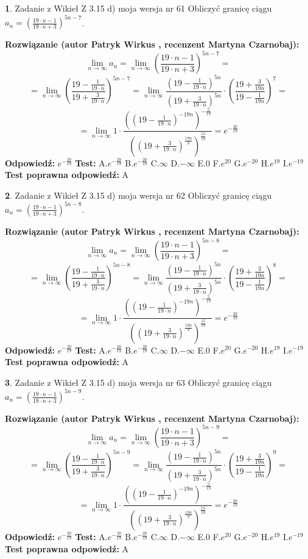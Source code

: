 \documentclass[12pt, a4paper]{article}
\theoremstyle{definition} %
\newtheorem{zad}{}
\newcommand{\zadStart}[1]{\begin{zad}#1\newline}
\newcommand{\zadStop}{\end{zad}}
\newcommand{\rozwStart}[2]{\noindent \textbf{Rozwiązanie (autor #1 , recenzent #2): }\newline}
\newcommand{\rozwStop}{\newline}
\newcommand{\odpStart}{\noindent \textbf{Odpowiedź:}\newline}
\newcommand{\odpStop}{\newline}
\newcommand{\testStart}{\noindent \textbf{Test:}\newline}
\newcommand{\testStop}{\newline}
\newcommand{\kluczStart}{\noindent \textbf{Test poprawna odpowiedź:}\newline}
\newcommand{\kluczStop}{\newline}
\begin{document}
\zadStart{Zadanie z Wikieł Z 3.15 d) moja wersja nr 61}
Obliczyć granicę ciągu $a_{n}=(\frac{19\cdot n - 1}{19 \cdot n + 3})^{5n-7}$.
\zadStop
\rozwStart{Patryk Wirkus}{Martyna Czarnobaj}
$$\lim\limits_{n\to\infty} a_{n} = \lim\limits_{n\to\infty}(\frac{19\cdot n - 1}{19 \cdot n + 3})^{5n-7}=$$
$$=\lim\limits_{n\to\infty}(\frac{19 - \frac{1}{19\cdot n}}{19 + \frac{3}{19 \cdot n}})^{5n-7}=\lim\limits_{n\to\infty}\frac{(19 - \frac{1}{19\cdot n})^{5n}}{(19 + \frac{3}{19\cdot n})^{5n}} \cdot (\frac{19+\frac{3}{19n}}{19-\frac{1}{19n}})^{7}=$$
$$=\lim\limits_{n\to\infty} 1 \cdot \frac{((19-\frac{1}{19 \cdot n})^{-19n})^{-\frac{5}{19}}}{((19+\frac{3}{19 \cdot n})^{\frac{19n}{3}})^{\frac{15}{19}}} =e^{-\frac{20}{19}}$$
\rozwStop
\odpStart
$e^{-\frac{20}{19}}$
\odpStop
\testStart
A.$ e^{-\frac{20}{19}}$
B.$ e^{-\frac{20}{19}}$
C.$\infty$
D.$-\infty$
E.$0$
F.$e^{20}$
G.$e^{-20}$
H.$e^{19}$
I.$e^{-19}$
\testStop
\kluczStart
A
\kluczStop



\zadStart{Zadanie z Wikieł Z 3.15 d) moja wersja nr 62}
Obliczyć granicę ciągu $a_{n}=(\frac{19\cdot n - 1}{19 \cdot n + 3})^{5n-8}$.
\zadStop
\rozwStart{Patryk Wirkus}{Martyna Czarnobaj}
$$\lim\limits_{n\to\infty} a_{n} = \lim\limits_{n\to\infty}(\frac{19\cdot n - 1}{19 \cdot n + 3})^{5n-8}=$$
$$=\lim\limits_{n\to\infty}(\frac{19 - \frac{1}{19\cdot n}}{19 + \frac{3}{19 \cdot n}})^{5n-8}=\lim\limits_{n\to\infty}\frac{(19 - \frac{1}{19\cdot n})^{5n}}{(19 + \frac{3}{19\cdot n})^{5n}} \cdot (\frac{19+\frac{3}{19n}}{19-\frac{1}{19n}})^{8}=$$
$$=\lim\limits_{n\to\infty} 1 \cdot \frac{((19-\frac{1}{19 \cdot n})^{-19n})^{-\frac{5}{19}}}{((19+\frac{3}{19 \cdot n})^{\frac{19n}{3}})^{\frac{15}{19}}} =e^{-\frac{20}{19}}$$
\rozwStop
\odpStart
$e^{-\frac{20}{19}}$
\odpStop
\testStart
A.$ e^{-\frac{20}{19}}$
B.$ e^{-\frac{20}{19}}$
C.$\infty$
D.$-\infty$
E.$0$
F.$e^{20}$
G.$e^{-20}$
H.$e^{19}$
I.$e^{-19}$
\testStop
\kluczStart
A
\kluczStop



\zadStart{Zadanie z Wikieł Z 3.15 d) moja wersja nr 63}
Obliczyć granicę ciągu $a_{n}=(\frac{19\cdot n - 1}{19 \cdot n + 3})^{5n-9}$.
\zadStop
\rozwStart{Patryk Wirkus}{Martyna Czarnobaj}
$$\lim\limits_{n\to\infty} a_{n} = \lim\limits_{n\to\infty}(\frac{19\cdot n - 1}{19 \cdot n + 3})^{5n-9}=$$
$$=\lim\limits_{n\to\infty}(\frac{19 - \frac{1}{19\cdot n}}{19 + \frac{3}{19 \cdot n}})^{5n-9}=\lim\limits_{n\to\infty}\frac{(19 - \frac{1}{19\cdot n})^{5n}}{(19 + \frac{3}{19\cdot n})^{5n}} \cdot (\frac{19+\frac{3}{19n}}{19-\frac{1}{19n}})^{9}=$$
$$=\lim\limits_{n\to\infty} 1 \cdot \frac{((19-\frac{1}{19 \cdot n})^{-19n})^{-\frac{5}{19}}}{((19+\frac{3}{19 \cdot n})^{\frac{19n}{3}})^{\frac{15}{19}}} =e^{-\frac{20}{19}}$$
\rozwStop
\odpStart
$e^{-\frac{20}{19}}$
\odpStop
\testStart
A.$ e^{-\frac{20}{19}}$
B.$ e^{-\frac{20}{19}}$
C.$\infty$
D.$-\infty$
E.$0$
F.$e^{20}$
G.$e^{-20}$
H.$e^{19}$
I.$e^{-19}$
\testStop
\kluczStart
A
\kluczStop
\end{document}
